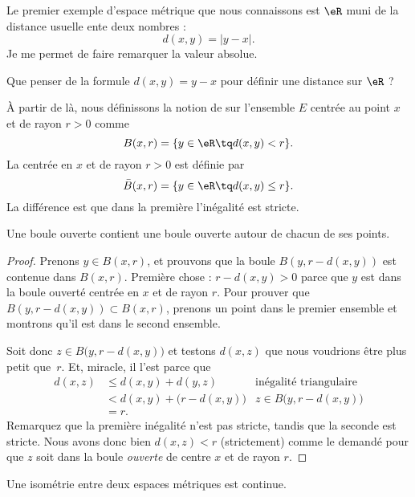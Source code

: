 Le premier exemple d'espace métrique que nous connaissons est $\eR$ muni de la distance usuelle ente deux nombres :
\begin{equation}
d(x,y)=| y-x |.
\end{equation}
Je me permet de faire remarquer la valeur absolue.

\begin{exercice}
Que penser de la formule $d(x,y)=y-x$ pour définir une distance sur $\eR$ ?
\end{exercice}

À partir de là, nous définissons la notion de  sur l'ensemble $E$ centrée au point $x$ et de rayon $r>0$ comme
\[
  B(x,r)=\{ y\in\eR\tq d(x,y)< r \}.
\]
La  centrée en $x$ et de rayon $r>0$ est définie par
\[
  \bar B(x,r)=\{ y\in\eR\tq d(x,y)\leq r \}.
\]
La différence est que dans la première l'inégalité est stricte.

\begin{theorem}     \label{ThoBoulOuvVois}
Une boule ouverte contient une boule ouverte autour de chacun de ses points.
\end{theorem}

\begin{proof}
Prenons $y\in B(x,r)$, et prouvons que la boule $B(y,r-d(x,y))$ est contenue dans $B(x,r)$. Première chose : $r-d(x,y)>0$ parce que $y$ est dans la boule ouverté centrée en $x$ et de rayon $r$. Pour prouver que  $B(y,r-d(x,y))\subset B(x,r)$, prenons un point dans le premier ensemble et montrons qu'il est dans le second ensemble.

Soit donc $z\in B\big(y,r-d(x,y)\big)$ et testons $d(x,z)$ que nous voudrions être plus petit que~$r$. Et, miracle, il l'est parce que
\begin{align*}
  d(x,z)    &\leq d(x,y)+d(y,z)&\text{inégalité triangulaire}\\
        &<d(x,y)+\big(r-d(x,y)\big)&\text{$z\in B\big(y,r-d(x,y)\big)$}\\
        &=r.
\end{align*}
Remarquez que la première inégalité n'est pas stricte, tandis que la seconde est stricte. Nous avons donc bien $d(x,z)<r$ (strictement) comme le demandé pour que $z$ soit dans la boule \emph{ouverte} de centre $x$ et de rayon $r$.
\end{proof}

\begin{proposition}\label{PropLYMgVMJ}
    Une isométrie entre deux espaces métriques est continue.
\end{proposition}


